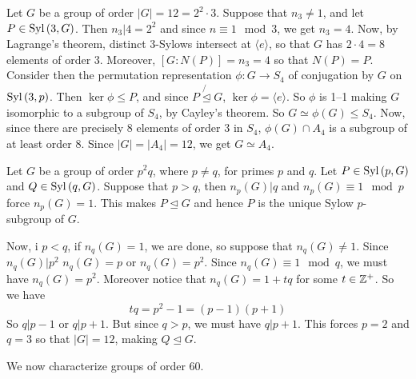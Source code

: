 \begin{example}\label{example_4.16}
  Let $G$ be a group of order $|G|=12=2^2 \cdot 3$. Suppose that $n_3 \neq
  1$, and let $P \in \operatorname{Syl}{(3,G)}$. Then $n_3|4=2^2$ and since $n \equiv 1
  \mod{3}$, we get $n_3=4$. Now, by Lagrange's theorem, distinct $3$-Sylows
  intersect at  $\langle e \rangle$, so that $G$ has $2 \cdot 4=8$ elements of
  order $3$. Moreover,  $[G:N(P)]=n_3=4$ so that $N(P)=P$. Consider then the
  permutation representation $\phi:G \xrightarrow{} S_4$ of conjugation by $G$
  on  $\operatorname{Syl}{(3,p)}$. Then $\ker{\phi} \leq P$, and since $P \not{\unlhd} G$,
  $\ker{\phi}=\langle e \rangle$. So $\phi$ is 1--1 making $G$ isomorphic to a
  subgroup of $S_4$, by Cayley's theorem. So $G \simeq \phi(G) \leq S_4$. Now,
  since there are precisely $8$ elements of order  $3$ in $S_4$, $\phi(G) \cap
  A_4$ is a subgroup of at least order $8$. Since $|G|=|A_4|=12$, we
  get $G \simeq A_4$.
\end{example}

\begin{example}\label{example_4.17}
  Let $G$ be a group of order  $p^2q$, where  $p \neq q$, for primes  $p$ and
  $q$. Let  $P \in \operatorname{Syl}{(p,G)}$ and $Q \in \operatorname{Syl}{(q,G)}$. Suppose that $p>q$,
  then  $n_p(G)|q$ and $n_p(G) \equiv 1 \mod{p}$ force $n_p(G)=1$. This makes
  $P \unlhd G$ and hence $P$ is the unique Sylow $p$-subgroup of $G$.

  Now, i  $p<q$, if $n_q(G)=1$, we are done, so suppose that $n_q(G) \neq 1$.
  Since $n_q(G)|p^2$ $n_q(G)=p$ or $n_q(G)=p^2$. Since  $n_q(G) \equiv 1
  \mod{q}$, we must have $n_q(G)=p^2$. Moreover notice that  $n_q(G)=1+tq$
  for some $t \in \mathbb{Z}^+$. So we have
  \begin{equation*}
    tq=p^2-1=(p-1)(p+1)
  \end{equation*}
  So $q|p-1$ or  $q|p+1$. But since  $q>p$, we must have  $q|p+1$. This
  forces  $p=2$ and  $q=3$ so that  $|G|=12$, making $Q \unlhd G$.
\end{example}

We now characterize groups of order $60$.

